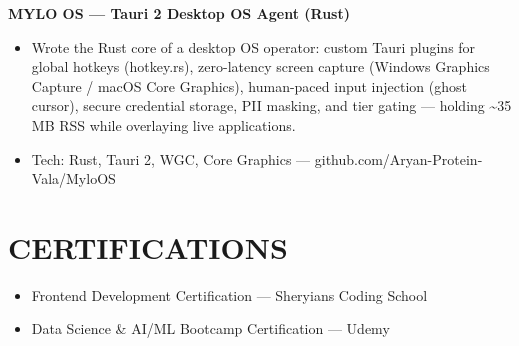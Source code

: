 \documentclass[9pt]{article}
\begin{document}
\textbf{MYLO OS  ---  Tauri 2 Desktop OS Agent (Rust)}
\vspace{1pt}
\begin{itemize}[leftmargin=11pt,itemsep=0pt,topsep=1pt,parsep=0pt]
\item Wrote the Rust core of a desktop OS operator: custom Tauri plugins for global hotkeys (hotkey.rs), zero-latency screen capture (Windows Graphics Capture / macOS Core Graphics), human-paced input injection (ghost cursor), secure credential storage, PII masking, and tier gating  ---  holding \textasciitilde{}35 MB RSS while overlaying live applications.
\item Tech: Rust, Tauri 2, WGC, Core Graphics  ---  github.com/Aryan-Protein-Vala/MyloOS
\end{itemize}
\section*{CERTIFICATIONS}
\begin{itemize}[leftmargin=11pt,itemsep=0pt,topsep=1pt,parsep=0pt]
\item Frontend Development Certification  ---  Sheryians Coding School
\item Data Science \& AI/ML Bootcamp Certification  ---  Udemy
\end{itemize}
\end{document}
